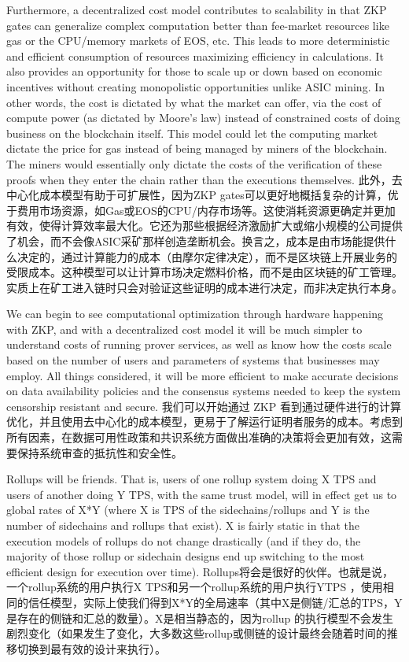 \documentclass{ctexart}
\begin{document}
Furthermore, a decentralized cost model contributes to scalability in that ZKP gates can generalize complex computation better than fee-market resources like gas or the CPU/memory markets of EOS, etc. This leads to more deterministic and efficient consumption of resources maximizing efficiency in calculations. It also provides an opportunity for those to scale up or down based on economic incentives without creating monopolistic opportunities unlike ASIC mining. In other words, the cost is dictated by what the market can offer, via the cost of compute power (as dictated by Moore's law) instead of constrained costs of doing business on the blockchain itself. This model could let the computing market dictate the price for gas instead of being managed by miners of the blockchain. The miners would essentially only dictate the costs of the verification of these proofs when they enter the chain rather than the executions themselves. 此外，去中心化成本模型有助于可扩展性，因为ZKP gates可以更好地概括复杂的计算，优于费用市场资源，如Gas或EOS的CPU/内存市场等。这使消耗资源更确定并更加有效，使得计算效率最大化。它还为那些根据经济激励扩大或缩小规模的公司提供了机会，而不会像ASIC采矿那样创造垄断机会。换言之，成本是由市场能提供什么决定的，通过计算能力的成本（由摩尔定律决定），而不是区块链上开展业务的受限成本。这种模型可以让计算市场决定燃料价格，而不是由区块链的矿工管理。实质上在矿工进入链时只会对验证这些证明的成本进行决定，而非决定执行本身。

We can begin to see computational optimization through hardware happening with ZKP, and with a decentralized cost model it will be much simpler to understand costs of running prover services, as well as know how the costs scale based on the number of users and parameters of systems that businesses may employ. All things considered, it will be more efficient to make accurate decisions on data availability policies and the consensus systems needed to keep the system censorship resistant and secure. 我们可以开始通过 ZKP 看到通过硬件进行的计算优化，并且使用去中心化的成本模型，更易于了解运行证明者服务的成本。考虑到所有因素，在数据可用性政策和共识系统方面做出准确的决策将会更加有效，这需要保持系统审查的抵抗性和安全性。

Rollups will be friends. That is, users of one rollup system doing X TPS and users of another doing Y TPS, with the same trust model, will in effect get us to global rates of X*Y (where X is TPS of the sidechains/rollups and Y is the number of sidechains and rollups that exist). X is fairly static in that the execution models of rollups do not change drastically (and if they do, the majority of those rollup or sidechain designs end up switching to the most efficient design for execution over time). Rollups将会是很好的伙伴。也就是说，一个rollup系统的用户执行X TPS和另一个rollup系统的用户执行YTPS ，使用相同的信任模型，实际上使我们得到X*Y的全局速率（其中X是侧链/汇总的TPS，Y是存在的侧链和汇总的数量）。X是相当静态的，因为rollup 的执行模型不会发生剧烈变化（如果发生了变化，大多数这些rollup或侧链的设计最终会随着时间的推移切换到最有效的设计来执行）。
\end{document}
